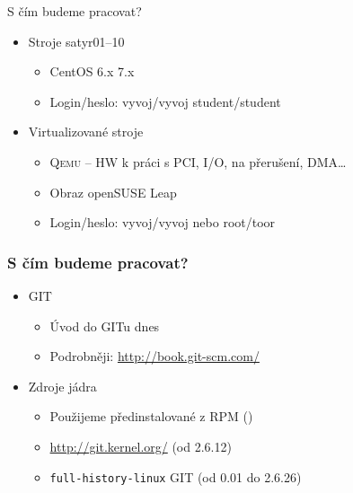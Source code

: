 
\begin{frame}{S čím budeme pracovat?}

  \begin{itemize}
    \item Stroje \iffimuni satyr01--10 \fi
    \begin{itemize}
      \item CentOS \iffimuni 6.x \else 7.x \fi
      \item Login/heslo: \iffimuni vyvoj/vyvoj \else student/student \fi
       \fi
    \end{itemize}

    \pause

    \item Virtualizované stroje
    \begin{itemize}
      \item \textsc{Qemu} -- HW k práci s PCI, I/O, na přerušení, DMA\dots

      \pause

      \item Obraz openSUSE Leap
      \item Login/heslo: vyvoj/vyvoj nebo root/toor
    \end{itemize}
  \end{itemize}

\end{frame}

\begin{frame}
  \frametitle{S čím budeme pracovat?}

  \begin{itemize}
    \item GIT
    \begin{itemize}
      \item Úvod do GITu dnes
      \item Podrobněji: \url{http://book.git-scm.com/}
    \end{itemize}

    \pause

    \item Zdroje jádra
    \begin{itemize}
      \item Použijeme předinstalované z RPM ()
      \item \url{http://git.kernel.org/} (od 2.6.12)
      \item \texttt{full-history-linux} GIT (od 0.01 do 2.6.26)
    \end{itemize}
  \end{itemize}

\end{frame}

